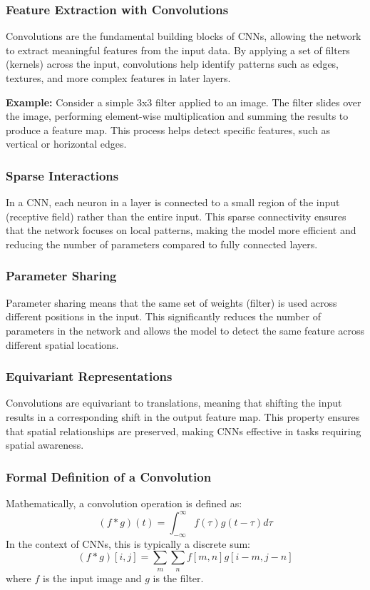 \documentclass[english,11pt,a4paper,titlepage]{article}
\begin{document}
	\subsubsection*{Feature Extraction with Convolutions}
	Convolutions are the fundamental building blocks of CNNs, allowing the network to extract meaningful features from the input data. By applying a set of filters (kernels) across the input, convolutions help identify patterns such as edges, textures, and more complex features in later layers. 
	
	\textbf{Example:}
	Consider a simple 3x3 filter applied to an image. The filter slides over the image, performing element-wise multiplication and summing the results to produce a feature map. This process helps detect specific features, such as vertical or horizontal edges.
	
	\subsubsection*{Sparse Interactions}
	In a CNN, each neuron in a layer is connected to a small region of the input (receptive field) rather than the entire input. This sparse connectivity ensures that the network focuses on local patterns, making the model more efficient and reducing the number of parameters compared to fully connected layers.
	
	\subsubsection*{Parameter Sharing}
	Parameter sharing means that the same set of weights (filter) is used across different positions in the input. This significantly reduces the number of parameters in the network and allows the model to detect the same feature across different spatial locations.
	
	\subsubsection*{Equivariant Representations}
	Convolutions are equivariant to translations, meaning that shifting the input results in a corresponding shift in the output feature map. This property ensures that spatial relationships are preserved, making CNNs effective in tasks requiring spatial awareness.
	
	\subsubsection*{Formal Definition of a Convolution}
	Mathematically, a convolution operation is defined as:
	\begin{equation*}
		(f * g)(t) = \int_{-\infty}^{\infty} f(\tau) g(t - \tau) d\tau
	\end{equation*}
	In the context of CNNs, this is typically a discrete sum:
	\begin{equation*}
		(f * g)[i, j] = \sum_m \sum_n f[m, n] g[i - m, j - n]
	\end{equation*}
	where \( f \) is the input image and \( g \) is the filter.
	
\end{document}
